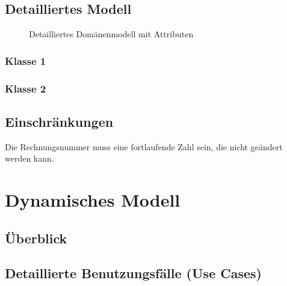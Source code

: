 \documentclass[a4paper,12pt,twoside]{scrreprt}
\begin{document}
    \section{Detailliertes Modell}
    \begin{figure}[ht!]
        \begin{center}
            \caption{Detailliertes Domänenmodell mit Attributen}\label{domainmodel_detail}
        \end{center}
    \end{figure}
    \subsection{Klasse 1}
    \subsection{Klasse 2}

    \section{Einschränkungen}
    Die Rechnungsnummer muss eine fortlaufende Zahl sein, die nicht geändert werden kann.

    \chapter{Dynamisches Modell}
    \section{Überblick}
    \section{Detaillierte Benutzungsfälle (Use Cases)}
        
\end{document}
